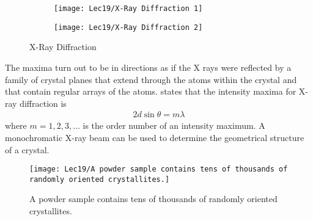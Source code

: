 \begin{figure}[H]
    \centering
    \begin{subfigure}{0.15\textwidth}
        \centering
        \texttt{[image: Lec19/X-Ray Diffraction 1]}
    \end{subfigure}
    \begin{subfigure}{0.15\textwidth}
        \centering
        \texttt{[image: Lec19/X-Ray Diffraction 2]}
    \end{subfigure}
    \caption{X-Ray Diffraction}
\end{figure}



The maxima turn out to be in directions as if the X rays were reflected by a family of crystal planes that extend through the atoms within the crystal and that contain regular arrays of the atoms.  states that the intensity maxima for X-ray diffraction is 
\begin{align*}
    2d\sin\theta=m\lambda
\end{align*}
where $m=1,2,3,\dots$ is the order number of an intensity maximum. A monochromatic X-ray beam can be used to determine the geometrical structure of a crystal. 

\begin{figure}[H]
    \centering
    \texttt{[image: Lec19/A powder sample contains tens of thousands of randomly oriented crystallites.]}
    \caption{A powder sample contains tens of thousands of randomly oriented crystallites.}
\end{figure}
